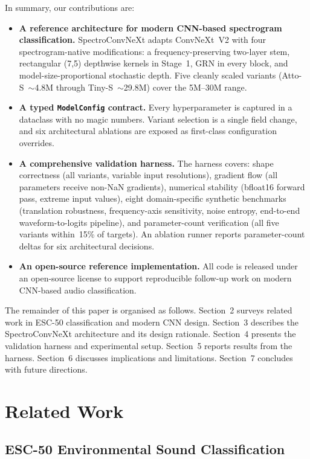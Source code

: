 \documentclass{article}
\begin{document}
In summary, our contributions are:
\begin{itemize}
  \item \textbf{A reference architecture for modern CNN-based spectrogram
  classification.} SpectroConvNeXt adapts ConvNeXt~V2 with four spectrogram-native
  modifications: a frequency-preserving two-layer stem, rectangular (7,5)
  depthwise kernels in Stage~1, GRN in every block, and
  model-size-proportional stochastic depth. Five cleanly scaled variants
  (Atto-S~$\sim$4.8M through Tiny-S~$\sim$29.8M) cover the 5M--30M range.
  \item \textbf{A typed \texttt{ModelConfig} contract.} Every hyperparameter is
  captured in a dataclass with no magic numbers. Variant selection is a single
  field change, and six architectural ablations are exposed as first-class
  configuration overrides.
  \item \textbf{A comprehensive validation harness.} The harness covers: shape
  correctness (all variants, variable input resolutions), gradient flow
  (all parameters receive non-NaN gradients), numerical stability (bfloat16
  forward pass, extreme input values), eight domain-specific synthetic
  benchmarks (translation robustness, frequency-axis sensitivity, noise
  entropy, end-to-end waveform-to-logits pipeline), and parameter-count
  verification (all five variants within~15\% of targets). An ablation runner
  reports parameter-count deltas for six architectural decisions.
  \item \textbf{An open-source reference implementation.} All code is released
  under an open-source license to support reproducible follow-up work on
  modern CNN-based audio classification.
\end{itemize}

The remainder of this paper is organised as follows. Section~2 surveys related
work in ESC-50 classification and modern CNN design. Section~3 describes the
SpectroConvNeXt architecture and its design rationale. Section~4 presents the
validation harness and experimental setup. Section~5 reports results from the
harness. Section~6 discusses implications and limitations. Section~7 concludes
with future directions.

\section{Related Work}

\subsection{ESC-50 Environmental Sound Classification}
\end{document}
